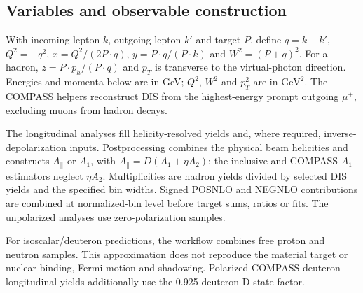 \documentclass[11pt,a4paper]{article}
\newcommand{\GeV}{\mathrm{GeV}}
\begin{document}
\subsection*{Variables and observable construction}
With incoming lepton $k$, outgoing lepton $k'$ and target $P$, define
$q=k-k'$, $Q^2=-q^2$, $x=Q^2/(2P\cdot q)$, $y=P\cdot q/(P\cdot k)$
and $W^2=(P+q)^2$. For a hadron, $z=P\cdot p_h/(P\cdot q)$ and $p_T$
is transverse to the virtual-photon direction. Energies and momenta below
are in GeV; $Q^2$, $W^2$ and $p_T^2$ are in $\GeV^2$.
The COMPASS helpers reconstruct DIS from the highest-energy prompt outgoing
$\mu^+$, excluding muons from hadron decays.

The longitudinal analyses fill helicity-resolved yields and, where required,
inverse-depolarization inputs. Postprocessing combines the physical beam
helicities and constructs $A_\parallel$ or $A_1$, with
$A_\parallel=D(A_1+\eta A_2)$; the inclusive and COMPASS $A_1$ estimators
neglect $\eta A_2$. Multiplicities are hadron yields divided by selected DIS
yields and the specified bin widths. Signed POSNLO and NEGNLO contributions
are combined at normalized-bin level before target sums, ratios or fits.
The unpolarized analyses use zero-polarization samples.

For isoscalar/deuteron predictions, the workflow combines free proton and
neutron samples. This approximation does not reproduce the material target
or nuclear binding, Fermi motion and shadowing. Polarized COMPASS deuteron
longitudinal yields additionally use the 0.925 deuteron D-state factor.
\clearpage
\end{document}
